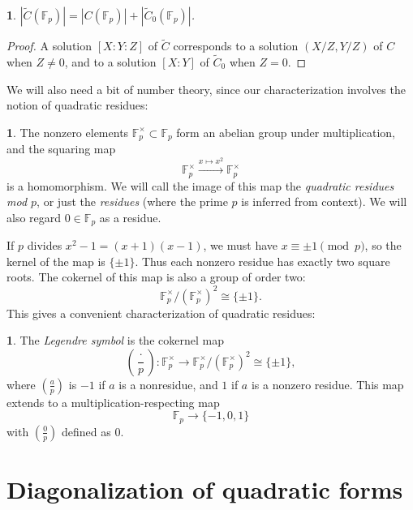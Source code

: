 \documentclass[10pt,a4paper]{amsart}
\numberwithin{equation}{section}
\numberwithin{figure}{section}
\numberwithin{table}{section}
\theoremstyle{definition}
\theoremstyle{plain}
\theoremstyle{remark}
\theoremstyle{plain}
\theoremstyle{definition}
\newtheorem{defn}[thm]{\protect\definitionname}
\theoremstyle{plain}
\theoremstyle{plain}
\newtheorem{lem}[thm]{\protect\lemmaname}
\providecommand{\definitionname}{Definition}
\providecommand{\lemmaname}{Lemma}
\newcommand{\legendre}[2]{\genfrac{(}{)}{}{}{#1}{#2}}
\newcommand{\F}{\mathbb{F}}
\begin{document}
	\begin{lem}\label{lem:relate-solutions-affine-proj}
		$|\widetilde{C}(\F_p)| = |C(\F_p)| + |\widetilde{C}_0(\F_p)|$.
	\end{lem} 
	\begin{proof}
		A solution $[X:Y:Z]$ of $\widetilde{C}$ corresponds 
		to a solution $(X/Z,Y/Z)$ of $C$ when $Z \neq 0$,
		and to a solution $[X:Y]$ of $\widetilde{C}_0$ 
		when $Z = 0$.  
	\end{proof}
	
	We will also need a bit of number theory, since our characterization
	involves the notion of quadratic residues:
	\begin{defn}
		The nonzero elements $\F_p^\times \subset \F_p$ form an abelian
		group under multiplication, and the squaring map 
		\[ \F^\times_p \xrightarrow{x \mapsto x^2} \F^\times_p \]
		is a homomorphism. We will call the image of this map the
		\emph{quadratic residues mod $p$}, or just the \emph{residues} (where the
		prime $p$ is inferred from context). We will also regard $0\in\F_p$ as a residue.
	\end{defn}
	
	If $p$ divides $x^2 - 1 = (x+1)(x-1)$, we must have $x \equiv \pm 1 \pmod{p}$, so 
	the kernel of the map is $\{\pm 1\}$. Thus each nonzero residue has exactly two 
	square roots. The cokernel of this map is also a group of order two: 
	\[ \F_p^\times / (\F_p^\times)^2 \cong \{\pm 1\}.  \]
	This gives a convenient characterization of quadratic residues:
	\begin{defn}
		The \emph{Legendre symbol} is the cokernel map    
		\[ \legendre{\cdot}{p}: 
		\F_p^\times \to \F_p^\times / (\F_p^\times)^2 \cong \{\pm 1\}, \]
		where $\legendre{a}{p}$ is $-1$ if $a$ is a nonresidue,
		and $1$ if $a$ is a nonzero residue. This map extends to a multiplication-respecting map
		\[ \F_p \to \{-1,0,1\} \]
		with $\legendre{0}{p}$ defined as $0$.
	\end{defn}
	
	\section{Diagonalization of quadratic forms}
	\label{sec:diagonalizing-quadratic-forms} 
	
\end{document}
